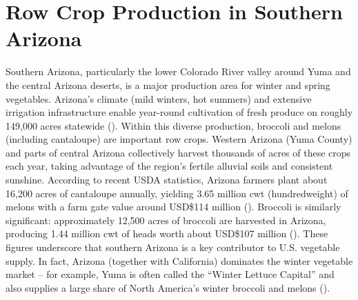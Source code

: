 \documentclass[letterpaper, notitlepage]{report}
\begin{document}
\section{Row Crop Production in Southern Arizona}

Southern Arizona, particularly the lower Colorado River valley around Yuma and the central Arizona deserts, is a major production area for winter and spring vegetables. Arizona’s climate (mild winters, hot summers) and extensive irrigation infrastructure enable year-round cultivation of fresh produce on roughly 149,000 acres statewide (\cite{Arizona-Department-of-Agriculture2018-dx}). Within this diverse production, broccoli and melons (including cantaloupe) are important row crops. Western Arizona (Yuma County) and parts of central Arizona collectively harvest thousands of acres of these crops each year, taking advantage of the region’s fertile alluvial soils and consistent sunshine. According to recent USDA statistics, Arizona farmers plant about 16,200 acres of cantaloupe annually, yielding 3.65 million cwt (hundredweight) of melons with a farm gate value around USD\$114 million (\cite{Arizona-Department-of-Agriculture2018-dx}). Broccoli is similarly significant: approximately 12,500 acres of broccoli are harvested in Arizona, producing 1.44 million cwt of heads worth about USD\$107 million (\cite{Arizona-Department-of-Agriculture2018-dx}). These figures underscore that southern Arizona is a key contributor to U.S. vegetable supply. In fact, Arizona (together with California) dominates the winter vegetable market – for example, Yuma is often called the “Winter Lettuce Capital” and also supplies a large share of North America’s winter broccoli and melons (\cite{Arizona-Department-of-Agriculture2018-dx}).
\end{document}
